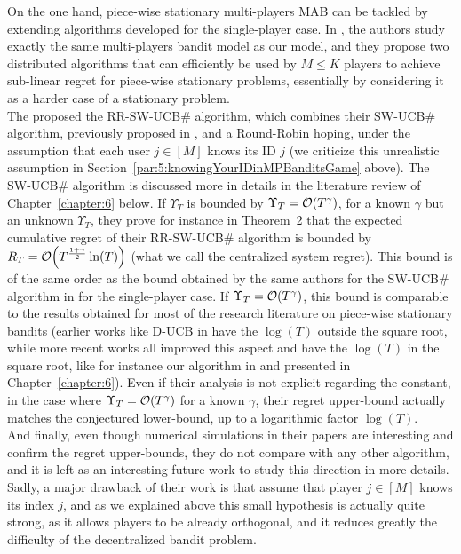 On the one hand, piece-wise stationary multi-players MAB can be tackled by extending algorithms developed for the single-player case.
In \cite{WeiSrivastava18Distributed}, the authors study exactly the same multi-players bandit model as our model, and they propose two distributed algorithms that can efficiently be used by $M \leq K$ players to achieve sub-linear regret for piece-wise stationary problems, essentially by considering it as a harder case of a stationary problem. \\
\indent
The proposed the RR-SW-UCB\# algorithm, which combines their SW-UCB\# algorithm, previously proposed in \cite{WeiSrivastava18Abruptly}, and a Round-Robin hoping, under the assumption that each user $j\in[M]$ knows its ID $j$ (we criticize this unrealistic assumption in Section~\ref{par:5:knowingYourIDinMPBanditsGame} above).
The SW-UCB\# algorithm is discussed more in details in the literature review of Chapter~\ref{chapter:6} below.
%
If $\Upsilon_T$ is bounded by $\Upsilon_T = \mathop{}\mathopen{}\mathcal{O}\mathopen{}\left(T^{\gamma}\right)$, for a known $\gamma$ but an unknown $\Upsilon_T$, they prove for instance in Theorem~2 \cite{WeiSrivastava18Distributed} that the expected cumulative regret of their RR-SW-UCB\# algorithm is bounded by $R_T = \mathop{}\mathopen{}\mathcal{O}\mathopen{}\left(T^{\frac{1+\gamma}{2}} \ln(T)\right)$ (what we call the centralized system regret).
This bound is of the same order as the bound obtained by the same authors for the SW-UCB\# algorithm in \cite{WeiSrivastava18Abruptly} for the single-player case.
If $\Upsilon_T = \mathop{}\mathopen{}\mathcal{O}\mathopen{}\left(T^{\gamma}\right)$, this bound is comparable to the results obtained for most of the research literature on piece-wise stationary bandits (earlier works like D-UCB in \cite{Garivier11UCBDiscount} have the $\log(T)$ outside the square root, while more recent works all improved this aspect and have the $\log(T)$ in the square root, like for instance our algorithm \GLRklUCB{} in \cite{Besson2019GLRT} and presented in Chapter~\ref{chapter:6}).
Even if their analysis is not explicit regarding the constant, in the case where $\Upsilon_T = \mathop{}\mathopen{}\mathcal{O}\mathopen{}\left(T^{\gamma}\right)$ for a known $\gamma$, their regret upper-bound actually matches the conjectured lower-bound, up to a logarithmic factor $\log(T)$. \\
%
\indent
And finally, even though numerical simulations in their papers \cite{WeiSrivastava18Abruptly,WeiSrivastava18Distributed} are interesting and confirm the regret upper-bounds, they do not compare with any other algorithm, and it is left as an interesting future work to study this direction in more details.
Sadly, a major drawback of their work is that assume that player $j\in[M]$ knows its index $j$, and as we explained above this small hypothesis is actually quite strong, as it allows players to be already orthogonal, and it reduces greatly the difficulty of the decentralized bandit problem.

